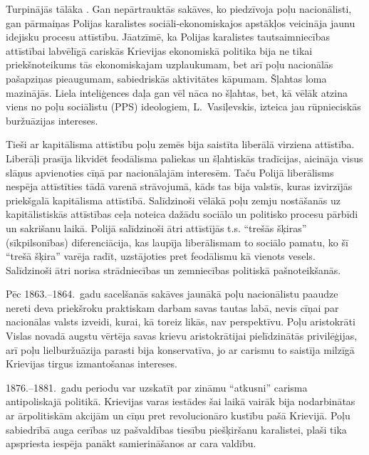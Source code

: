 \documentclass[twoside,a5paper,12pt,fleqn,openany]{extbook}
\begin{document}
Turpinājās tālāka . Gan nepārtrauktās sakāves, ko piedzīvoja poļu nacionālisti, gan pārmaiņas Polijas karalistes sociāli-ekonomiskajos apstākļos veicināja jaunu idejisku procesu attīstību. Jāatzīmē, ka Polijas karalistes tautsaimniecības attīstībai labvēlīgā cariskās Krievijas ekonomiskā politika bija ne tikai priekšnoteikums tās ekonomiskajam uzplaukumam, bet arī poļu nacionālās pašapziņas pieaugumam, sabiedriskās aktivitātes kāpumam. Šļahtas loma mazinājās. Liela inteliģences daļa gan vēl nāca no šļahtas, bet, kā vēlāk atzina viens no poļu sociālistu (PPS) ideologiem, L.~Vasiļevskis, izteica jau rūpnieciskās buržuāzijas intereses.

Tieši ar kapitālisma attīstību poļu zemēs bija saistīta liberālā virziena attīstība. Liberāļi prasīja likvidēt feodālisma paliekas un šļahtiskās tradīcijas, aicināja visus slāņus apvienoties cīņā par nacionālajām interesēm. Taču Polijā liberālisms nespēja attīstīties tādā varenā strāvojumā, kāds tas bija valstīs, kuras izvirzījās priekšgalā kapitālisma attīstībā. Salīdzinoši vēlākā poļu zemju nostāšanās uz kapitālistiskās attīstības ceļa noteica dažādu sociālo un politisko procesu pārbīdi un sakrišanu laikā. Polijā salīdzinoši ātri attīstījās t.s. ``trešās šķiras'' (sīkpilsonības) diferenciācija, kas laupīja liberālismam to sociālo pamatu, ko šī ``trešā šķira'' varēja radīt, uzstājoties pret feodālismu kā vienots vesels. Salīdzinoši ātri norisa strādniecības un zemniecības politiskā pašnoteikšanās.

Pēc 1863.--1864.~gadu sacelšanās sakāves jaunākā poļu nacionālistu paaudze nereti deva priekšroku praktiskam darbam savas tautas labā, nevis cīņai par nacionālas valsts izveidi, kurai, kā toreiz likās, nav perspektīvu. Poļu aristokrāti Vislas novadā augstu vērtēja savas krievu aristokrātijai pielīdzinātās privilēģijas, arī poļu lielburžuāzija parasti bija konservatīva, jo ar carismu to saistīja milzīgā Krievijas tirgus izmantošanas intereses.

1876.--1881.~gadu periodu var uzskatīt par zināmu ``atkusni'' carisma antipoliskajā politikā. Krievijas varas iestādes šai laikā vairāk bija nodarbinātas ar ārpolitiskām akcijām un cīņu pret revolucionāro kustību pašā Krievijā. Poļu sabiedrībā auga cerības uz pašvaldības tiesību piešķiršanu karalistei, plaši tika apspriesta iespēja panākt samierināšanos ar cara valdību.
\end{document}
